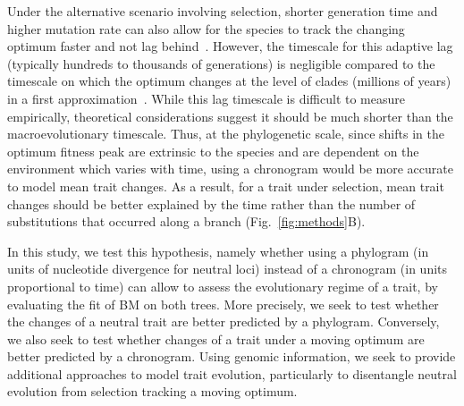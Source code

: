\documentclass{article}
\begin{document}
Under the alternative scenario involving selection, shorter generation time and higher mutation rate can also allow for the species to track the changing optimum faster and not lag behind~\citep{lande_natural_1976, hansen_comparative_2008}.
However, the timescale for this adaptive lag (typically hundreds to thousands of generations) is negligible compared to the timescale on which the optimum changes at the level of clades (millions of years) in a first approximation~\citep{hansen_three_2024}.
While this lag timescale is difficult to measure empirically, theoretical considerations suggest it should be much shorter than the macroevolutionary timescale.
Thus, at the phylogenetic scale, since shifts in the optimum fitness peak are extrinsic to the species and are dependent on the environment which varies with time, using a chronogram would be more accurate to model mean trait changes.
As a result, for a trait under selection, mean trait changes should be better explained by the time rather than the number of substitutions that occurred along a branch (Fig.~\ref{fig:methods}B).

In this study, we test this hypothesis, namely whether using a phylogram (in units of nucleotide divergence for neutral loci) instead of a chronogram (in units proportional to time) can allow to assess the evolutionary regime of a trait, by evaluating the fit of BM on both trees.
More precisely, we seek to test whether the changes of a neutral trait are better predicted by a phylogram.
Conversely, we also seek to test whether changes of a trait under a moving optimum are better predicted by a chronogram.
Using genomic information, we seek to provide additional approaches to model trait evolution, particularly to disentangle neutral evolution from selection tracking a moving optimum.
\end{document}
